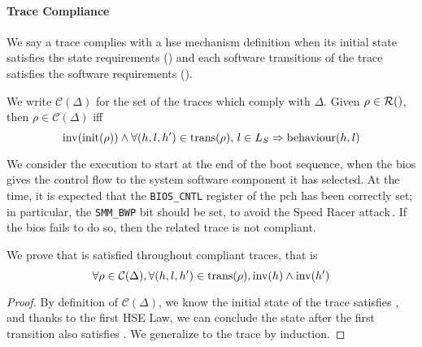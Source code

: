 \paragraph{Trace Compliance}
%
We say a trace complies with a \ac{hse} mechanism definition when its initial
state satisfies the state requirements () and each software
transitions of the trace satisfies the software requirements ().
%
\begin{definition}
  We write $\mathcal{C}(\Delta)$ for the set of the traces which comply with
  $\Delta$.
  Given $\rho \in \pathesLTS{Ez}$, then $\rho \in \mathcal{C}(\Delta)$ iff
  \[
    \mathrm{inv}(\mathrm{init}(\rho)) \wedge \forall (h,l,h') \in
    \mathrm{trans}(\rho)\text{, }l \in L_S \Rightarrow \mathrm{behaviour}(h, l)
  \]
\end{definition}

\begin{example}
  We consider the execution to start at the end of the boot sequence, when the
  \ac{bios} gives the control flow to the system software component it has
  selected.
  At the time, it is expected that the \texttt{BIOS\_CNTL} register of the
  \ac{pch} has been correctly set; in particular, the \texttt{SMM\_BWP} bit
  should be set, to avoid the Speed Racer
  attack\,\cite{kallenberg2015racecondition}.
  If the \ac{bios} fails to do so, then the related trace is not compliant.
\end{example}

\begin{lemma}
  \label{lemma:speccert:hseinv}
  We prove that  is satisfied throughout compliant traces, that is
  \[
    \forall \rho \in \mathcal{C}(\Delta), \forall (h, l, h') \in
    \mathrm{trans}(\rho), \mathrm{inv}(h) \wedge \mathrm{inv}(h')
  \]

  \begin{proof}
    By definition of $\mathcal{C}(\Delta)$, we know the initial state of the
    trace satisfies , and thanks to the first HSE Law, we can conclude
    the state after the first transition also satisfies .
    We generalize to the trace by induction.
  \end{proof}
\end{lemma}

